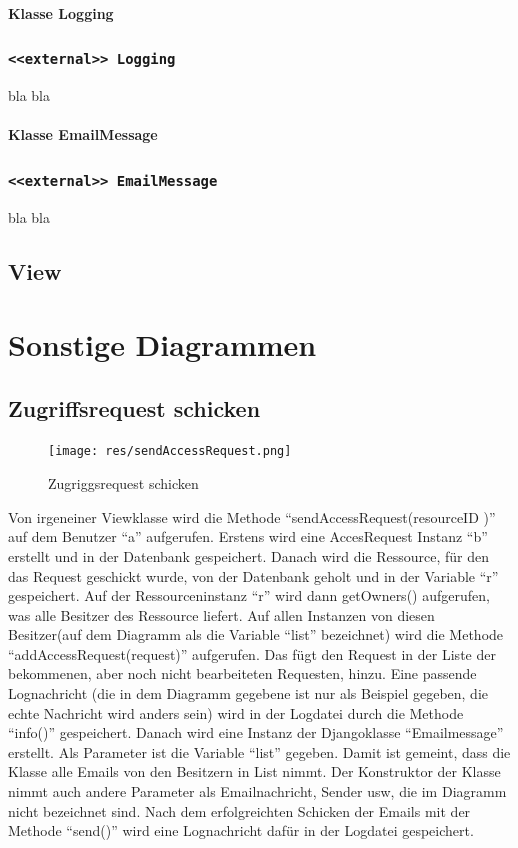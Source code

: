 \documentclass[parskip=full,11pt]{scrartcl}
\newcommand{\class}[1]{\subsubsection*{\lstinline[basicstyle=\ttfamily\large]{#1}}}
\begin{document}
  \paragraph*{Klasse Logging}
 \class{<<external>> Logging}
 bla bla
 
 
  \paragraph*{Klasse EmailMessage}
 \class{<<external>> EmailMessage}
 bla bla
 
\subsection{View} 
 \section{Sonstige Diagrammen}
 \subsection{Zugriffsrequest schicken}
 \begin{figure}[ht!]
 	\centering
 	\texttt{[image: res/sendAccessRequest.png]}
 	\caption{Zugriggsrequest schicken}
 	\label{fig:sendAccReq}
 \end{figure}
 
Von irgeneiner Viewklasse wird die Methode \enquote{sendAccessRequest(resourceID )} auf dem Benutzer \enquote{a}  aufgerufen. Erstens wird eine AccesRequest Instanz \enquote{b} erstellt und in der Datenbank gespeichert. Danach wird die Ressource, für den das Request geschickt wurde, von der Datenbank geholt und in der Variable \enquote{r} gespeichert. Auf der Ressourceninstanz \enquote{r} wird dann getOwners() aufgerufen, was alle Besitzer des Ressource liefert. Auf allen Instanzen von diesen Besitzer(auf dem Diagramm als die Variable \enquote{list} bezeichnet) wird die Methode  \enquote{addAccessRequest(request)} aufgerufen. Das fügt den Request in der Liste der bekommenen, aber noch nicht bearbeiteten Requesten, hinzu. Eine passende Lognachricht (die in dem Diagramm gegebene ist nur als Beispiel gegeben, die echte Nachricht wird anders sein) wird in der Logdatei durch die Methode \enquote{info()} gespeichert. Danach wird eine Instanz der Djangoklasse \enquote{Emailmessage} erstellt. Als Parameter ist die Variable \enquote{list} gegeben. Damit ist gemeint, dass die Klasse alle Emails von den Besitzern in List nimmt. Der Konstruktor der Klasse nimmt auch andere Parameter als Emailnachricht, Sender usw, die im Diagramm nicht bezeichnet sind. Nach dem erfolgreichten Schicken der Emails mit der Methode  \enquote{send()} wird eine Lognachricht dafür in der Logdatei gespeichert. 
 
\end{document}
